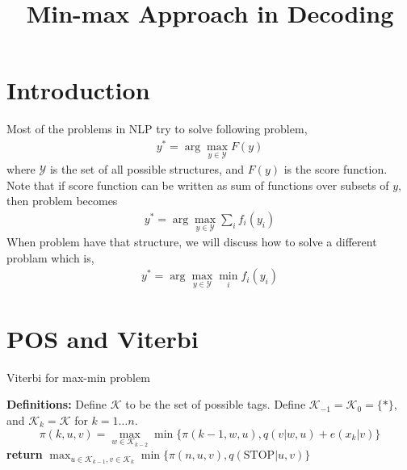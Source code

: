 \documentclass{article}
\title{Min-max Approach in Decoding}
\begin{document}
\maketitle
\section*{Introduction}

Most of the problems in NLP try to solve following problem, 
\begin{align*}
 y^* = \arg\max_{y\in\mathcal{Y}} F(y)
\end{align*}
where $\mathcal{Y}$ is the set of all possible structures, and $F(y)$ is the
score function. Note that if score function can be written as sum of functions
over subsets of $y$, then problem becomes
\begin{align*}
y^* = \arg\max_{y\in\mathcal{Y}} \sum_i f_i(y_i)
\end{align*}
When problem have that structure, we will discuss how to solve a different
problam which is,
\begin{align*}
y^* = \arg\max_{y\in\mathcal{Y}} \min_i f_i(y_i)
\end{align*}

\section*{POS and Viterbi}


\begin{algorithm}
\caption{Viterbi for max-min problem}
\begin{algorithmic}
	\State \textbf{Definitions:} Define $\mathcal{K}$ to be the set of possible tags.
Define $\mathcal{K}_{-1} = \mathcal{K}_{0} = \{*\}$, and $\mathcal{K}_k =
\mathcal{K}$ for $k=1\dots n$.
			\State \[\pi(k,u,v) = \max_{w \in \mathcal{K}_{k-2}} \min \{\pi(k-1,w,u),
			q(v|w,u)+e(x_k|v)
			\}
			\]
		\EndFor
   \EndFor
   \State \textbf{return} $\max_{u \in \mathcal{K}_{k-1}, v \in
   \mathcal{K}_k} \min\{\pi(n,u,v),q(\text{STOP}|u,v)\}$
\end{algorithmic}
\end{algorithm}
\end{document}
